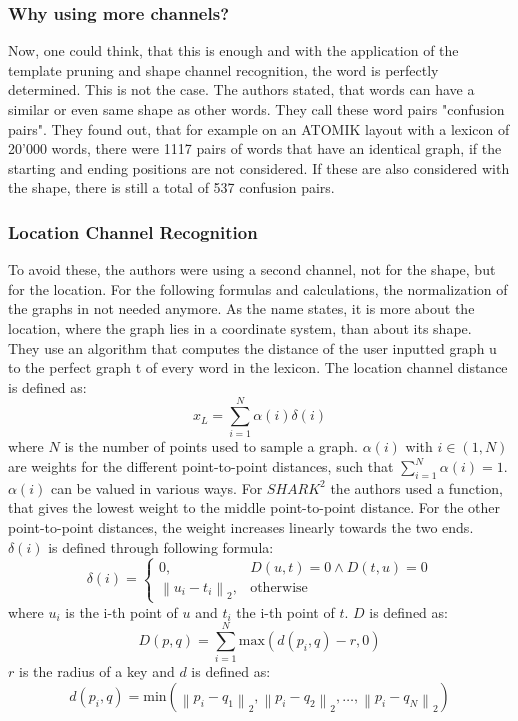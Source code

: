 \subsubsection{Why using more channels?}
Now, one could think, that this is enough and with the application of the template pruning and shape channel recognition, the word is perfectly determined. This is not the case. The authors stated, that words can have a similar or even same shape as other words. They call these word pairs "confusion pairs". They found out, that for example on an ATOMIK layout with a lexicon of 20'000 words, there were 1117 pairs of words that have an identical graph, if the starting and ending positions are not considered. If these are also considered with the shape, there is still a total of 537 confusion pairs.\\

\subsubsection{Location Channel Recognition}
To avoid these, the authors were using a second channel, not for the shape, but for the location. For the following formulas and calculations, the normalization of the graphs in not needed anymore. As the name states, it is more about the location, where the graph lies in a coordinate system, than about its shape.\\
They use an algorithm that computes the distance of the user inputted graph u to the perfect graph t of every word in the lexicon. The location channel distance is defined as:
\begin{equation}
    x_L = \sum_{i = 1}^{N}\alpha(i)\delta(i)
    \label{eqn:locationformula}
\end{equation}
where $N$ is the number of points used to sample a graph. $\alpha(i)$ with $i \in (1,N)$ are weights for the different point-to-point distances, such that $\sum_{i = 1}^{N}\alpha(i) = 1$. $\alpha(i)$ can be valued in various ways. For $SHARK^2$ the authors used a function, that gives the lowest weight to the middle point-to-point distance. For the other point-to-point distances, the weight increases linearly towards the two ends. $\delta(i)$ is defined through following formula:
\begin{equation}
    \delta(i) =
        \begin{cases}
            0, & D(u,t) = 0 \land D(t,u) = 0 \\
            \left\lVert u_i - t_i \right\rVert_2, & \text{otherwise}
        \end{cases}
\end{equation}
where $u_i$ is the i-th point of $u$ and $t_i$ the i-th point of $t$. $D$ is defined as:
\begin{equation}
    D(p,q) = \sum_{i = 1}^{N}\text{max}(d(p_i,q) - r,0)
\end{equation}
$r$ is the radius of a key and $d$ is defined as:
\begin{equation}
    d(p_i,q) = \text{min}(\left\lVert p_i - q_1 \right\rVert_2, \left\lVert p_i - q_2 \right\rVert_2, \dots, \left\lVert p_i - q_N\right\rVert_2)
\end{equation}

